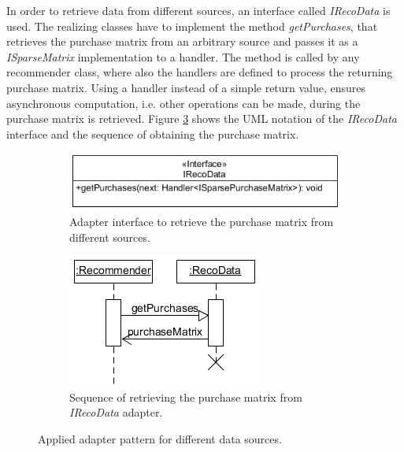 \documentclass[10pt]{reportMaster}
\begin{document}
In order to retrieve data from different sources, an interface called \textit{IRecoData} is used.
The realizing classes have to implement the method \textit{getPurchases}, that retrieves the purchase matrix from an arbitrary source and passes it as a \textit{ISparseMatrix} implementation to a handler.
The method is called by any recommender class, where also the handlers are defined to process the returning purchase matrix.
Using a handler instead of a simple return value, ensures asynchronous computation, i.e. other operations can be made, during the purchase matrix is retrieved.
Figure \ref{fig:getPurchases} shows the UML notation of the \textit{IRecoData} interface and the sequence of obtaining the purchase matrix.


\begin{figure}
	\centering
	\begin{subfigure}[t]{0.6\textwidth}
		\includegraphics[width=\textwidth]{figures/implementation/IRecoDataInterface}
		\caption{Adapter interface to retrieve the purchase matrix from different sources.}
		\label{fig:irecodataInterface}
	\end{subfigure}
	\begin{subfigure}[t]{0.35\textwidth}
		\includegraphics[width=\textwidth]{figures/implementation/getPurchasesSequence}
		\caption{Sequence of retrieving the purchase matrix from \textit{IRecoData} adapter.}
		\label{fig:getPurchasesSequence}
	\end{subfigure}
	\caption{Applied adapter pattern for different data sources.}
	\label{fig:getPurchases}
\end{figure}
\end{document}
